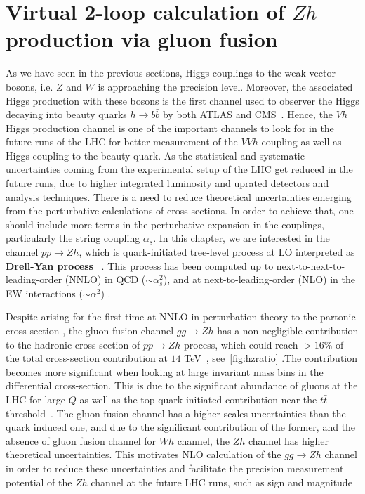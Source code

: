 \chapter{ Virtual 2-loop calculation of  $Zh$ production via gluon fusion}\label{chap:hz}
\par As we have seen in the previous sections, Higgs couplings to the weak vector bosons, i.e. $Z$ and $W$ is approaching the precision level. Moreover, the associated Higgs production with these bosons is the first channel used to observer the Higgs decaying into beauty quarks   $h \rightarrow b \bar{b}$ by both ATLAS and CMS~\cite{Aaboud:2018zhk, Sirunyan:2018kst}. Hence, the $ Vh$ Higgs production channel is one of the important channels to look for in the future runs of the LHC for better measurement of the $VVh$ coupling as well as Higgs coupling to the beauty quark. As the statistical and systematic uncertainties coming from the experimental setup of the LHC get reduced in the future runs, due to higher integrated luminosity and uprated detectors and analysis techniques. There is a  need to reduce theoretical uncertainties emerging from the perturbative calculations of  cross-sections. In order to achieve that, one should include more terms in the perturbative expansion in the couplings, particularly the string coupling $\alpha_s$. In this chapter, we are interested in the channel $pp\to Zh$, which is quark-initiated tree-level process at LO interpreted as \textbf{Drell-Yan process}~ \cite{Han:1991ia,Brein:2003wg}. This process has been computed up to next-to-next-to-leading-order (NNLO) in QCD ($\sim \alpha_s^2$), and
at next-to-leading-order (NLO) in the EW interactions ($\sim \alpha^2 $) \cite{Amoroso:2020lgh}.
\par Despite arising for the first time at NNLO in perturbation theory to the partonic cross-section  , the gluon fusion channel $g g \rightarrow Zh$ has a non-negligible contribution to the hadronic cross-section of  $pp\to Zh$ process, which could reach $>16\%$ of the total cross-section contribution at $14$ TeV~\cite{Cepeda:2019klc}, see~\autoref{fig:hzratio} .The contribution becomes more significant when looking at large invariant mass bins in the differential cross-section. This is due to the significant abundance of gluons at the LHC for large $Q$ as well as the top quark initiated contribution near the $t\bar t$ threshold~\cite{Englert:2013vua}.  The gluon fusion channel has a higher scales uncertainties than the quark induced one, and due to the significant contribution of the former, and the absence of gluon fusion channel for $Wh$ channel, the $Zh$ channel has  higher theoretical uncertainties. This motivates NLO calculation of the  $g g \rightarrow Z h$ channel in order to reduce these uncertainties and facilitate the precision measurement potential of the $Zh$ channel at the future LHC runs, such as sign and magnitude
